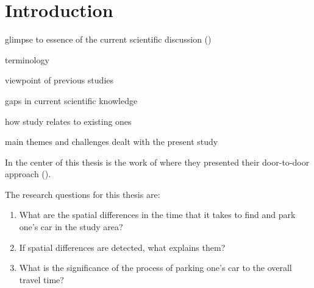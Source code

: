 \section{Introduction}
\justify
glimpse to essence of the current scientific discussion (\cite{Geurs2004})  \par
terminology \par
viewpoint of previous studies \par
gaps in current scientific knowledge \par
how study relates to existing ones \par
main themes and challenges dealt with the present study \par

In the center of this thesis is the work of \citeauthor{Salonen2013} where they presented their door-to-door approach (\citeyear{Salonen2013}). 

\noindent
The research questions for this thesis are:

\begin{spacing}{1}
\begin{enumerate}[label=\Roman*] %
  \item What are the spatial differences in the time that it takes to find and park one’s car in the study area?
  \item If spatial differences are detected, what explains them?
  \item What is the significance of the process of parking one’s car to the overall travel time?
\end{enumerate}
\end{spacing}